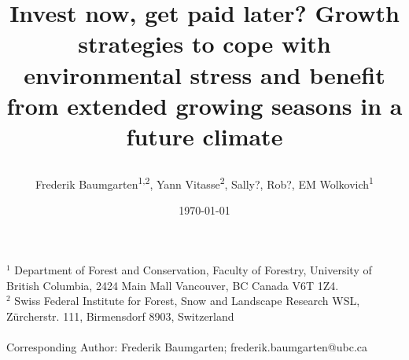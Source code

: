 \documentclass{article}
\begin{document}
	
	
	\title{Invest now, get paid later? Growth strategies to cope with environmental stress and benefit from extended growing seasons in a future climate %
		
		
	} 
	
	\date{\today}
	\author{Frederik Baumgarten\textsuperscript{1,2}, Yann Vitasse\textsuperscript{2}, Sally?, Rob?, EM Wolkovich\textsuperscript{1}}
	\maketitle
	
	$^1$ Department of Forest and Conservation, Faculty of Forestry, University of British Columbia, 2424 Main Mall
	Vancouver, BC Canada V6T 1Z4. \\
	
	
	
	$^2$  Swiss Federal Institute for Forest, Snow and Landscape Research WSL, Zürcherstr. 111, Birmensdorf 8903, Switzerland\\ \\
	
	Corresponding Author: Frederik Baumgarten; frederik.baumgarten@ubc.ca \\
	
	
	
	
	
\end{document}
